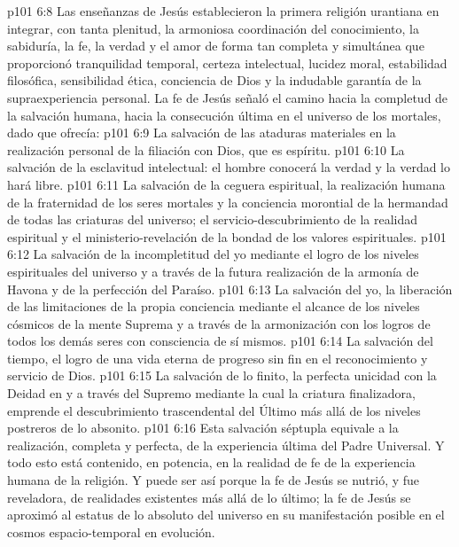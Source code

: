 \vs p101 6:8 Las enseñanzas de Jesús establecieron la primera religión urantiana en integrar, con tanta plenitud, la armoniosa coordinación del conocimiento, la sabiduría, la fe, la verdad y el amor de forma tan completa y simultánea que proporcionó tranquilidad temporal, certeza intelectual, lucidez moral, estabilidad filosófica, sensibilidad ética, conciencia de Dios y la indudable garantía de la supraexperiencia personal. La fe de Jesús señaló el camino hacia la completud de la salvación humana, hacia la consecución última en el universo de los mortales, dado que ofrecía:
\vs p101 6:9 La salvación de las ataduras materiales en la realización personal de la filiación con Dios, que es espíritu.
\vs p101 6:10 La salvación de la esclavitud intelectual: el hombre conocerá la verdad y la verdad lo hará libre.
\vs p101 6:11 La salvación de la ceguera espiritual, la realización humana de la fraternidad de los seres mortales y la conciencia morontial de la hermandad de todas las criaturas del universo; el servicio\hyp{}descubrimiento de la realidad espiritual y el ministerio\hyp{}revelación de la bondad de los valores espirituales.
\vs p101 6:12 La salvación de la incompletitud del yo mediante el logro de los niveles espirituales del universo y a través de la futura realización de la armonía de Havona y de la perfección del Paraíso.
\vs p101 6:13 La salvación del yo, la liberación de las limitaciones de la propia conciencia mediante el alcance de los niveles cósmicos de la mente Suprema y a través de la armonización con los logros de todos los demás seres con consciencia de sí mismos.
\vs p101 6:14 La salvación del tiempo, el logro de una vida eterna de progreso sin fin en el reconocimiento y servicio de Dios.
\vs p101 6:15 La salvación de lo finito, la perfecta unicidad con la Deidad en y a través del Supremo mediante la cual la criatura finalizadora, emprende el descubrimiento trascendental del Último más allá de los niveles postreros de lo absonito.
\vs p101 6:16 \pc Esta salvación séptupla equivale a la realización, completa y perfecta, de la experiencia última del Padre Universal. Y todo esto está contenido, en potencia, en la realidad de fe de la experiencia humana de la religión. Y puede ser así porque la fe de Jesús se nutrió, y fue reveladora, de realidades existentes más allá de lo último; la fe de Jesús se aproximó al estatus de lo absoluto del universo en su manifestación posible en el cosmos espacio\hyp{}temporal en evolución.
